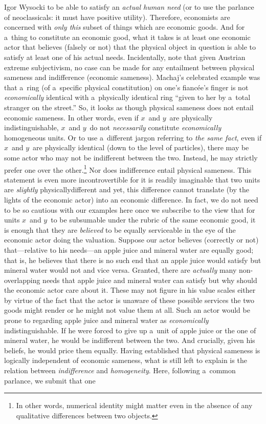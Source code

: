 \begin{artengenv}{Igor Wysocki}
to be able to satisfy an \textit{actual human need} (or to use the parlance of neoclassicals: it must have positive utility). Therefore, economists are concerned with \textit{only this} subset of things which are economic goods. And for a~thing to constitute an economic good, what it takes is at least one economic actor that believes (falsely or not) that the physical object in question is able to satisfy at least one of his actual needs. Incidentally, note that given Austrian extreme subjectivism, no case can be made for any entailment between physical sameness and indifference (economic sameness). Machaj's
\parencite*[][p.232]{machaj_praxeological_2007} %
 celebrated example was that a~ring (of a~specific physical constitution) on one's fiancée's finger is not \textit{economically} identical with a~physically identical ring ``given to her by a~total stranger on the street.'' So, it looks as though physical sameness does not entail economic sameness. In other words, even if $x$~and $y$~are physically indistinguishable, $x$~and $y$~do not \textit{necessarily} constitute \textit{economically} homogeneous units. Or to use a~different jargon referring to \textit{the same fact}, even if $x$~and $y$~are physically identical (down to the level of particles), there may be some actor who may not be indifferent between the two. Instead, he may strictly prefer one over the other.\footnote{In other words, numerical identity might matter even in the absence of any qualitative differences between two objects.} Nor does indifference entail physical sameness. This statement is even more incontrovertible for it is readily imaginable that two units are \textit{slightly} physicallydifferent and yet, this difference cannot translate (by the lights of the economic actor) into an economic difference. In fact, we do not need to be so cautious with our examples here once we subscribe to the view that for units $x$~and $y$~to be subsumable under the rubric of the same economic good, it is enough that they are \textit{believed} to be equally serviceable in the eye of the economic actor doing the valuation. Suppose our actor believes (correctly or not) that---relative to his needs---an apple juice and mineral water are equally good; that is, he believes that there is no such end that an apple juice would satisfy but mineral water would not and vice versa. Granted, there are \textit{actually} many non-overlapping needs that apple juice and mineral water can satisfy but why should the economic actor care about it. These may not figure in his value scales either by virtue of the fact that the actor is unaware of these possible services the two goods might render or he might not value them at all. Such an actor would be prone to regarding apple juice and mineral water as \textit{economically} indistinguishable. If he were forced to give up a~unit of apple juice or the one of mineral water, he would be indifferent between the two. And crucially, given his beliefs, he would price them equally. Having established that physical sameness is logically independent of economic sameness, what is still left to explain is the relation between \textit{indifference} and \textit{homogeneity}. Here, following a~common parlance, we submit that one 
\end{artengenv}
